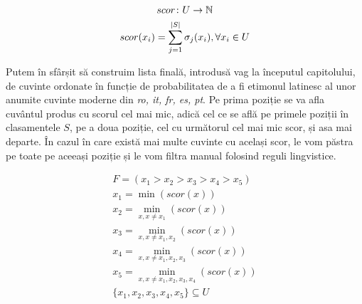 \begin{gather*}
  scor \colon U \to \mathbb{N} \\
  scor(x_i) = \smashoperator{\sum_{j=1}^{|S|}} \sigma_j(x_i), \forall x_i \in U
\end{gather*}

Putem în sfârșit să construim lista finală, introdusă vag la începutul capitolului, de cuvinte 
ordonate în funcție de probabilitatea de a fi etimonul latinesc al unor anumite cuvinte moderne 
din \textit{ro, it, fr, es, pt}. Pe prima poziție se va afla cuvântul produs cu scorul cel mai mic,
adică cel ce se află pe primele poziții în clasamentele $S$, pe a doua poziție, cel cu următorul cel
mai mic scor, și asa mai departe. În cazul în care există mai multe cuvinte cu același scor, le 
vom păstra pe toate pe aceeași poziție și le vom filtra manual folosind reguli lingvistice.

\begin{gather*}
  F = (x_1 > x_2 > x_3 > x_4 > x_5) \\
  x_1 = \min (scor(x)) \\
  x_2 = \min_{x, x \neq x_1} (scor(x)) \\
  x_3 = \min_{x, x \neq x_1, x_2} (scor(x)) \\
  x_4 = \min_{x, x \neq x_1, x_2, x_3} (scor(x)) \\
  x_5 = \min_{x, x \neq x_1, x_2, x_3, x_4} (scor(x)) \\
  \{x_1, x_2, x_3, x_4, x_5\} \subseteq U
\end{gather*}

